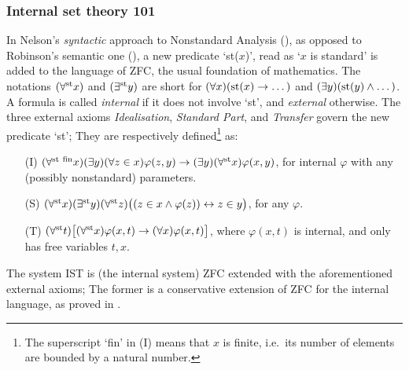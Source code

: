 \documentclass[reqno]{amsart}
\def\st{\textup{st}}
\def\di{\rightarrow}
\def\asa{\leftrightarrow}
\numberwithin{equation}{section}
\numberwithin{thm}{section}
\begin{document}
\subsubsection{Internal set theory 101}\label{IIST}
In Nelson's \emph{syntactic} approach to Nonstandard Analysis (\cite{wownelly}), as opposed to Robinson's semantic one (\cite{robinson1}), a new predicate `st($x$)', read as `$x$ is standard' is added to the language of \textsf{ZFC}, the usual foundation of mathematics.  
The notations $(\forall^{\st}x)$ and $(\exists^{\st}y)$ are short for $(\forall x)(\st(x)\di \dots)$ and $(\exists y)(\st(y)\wedge \dots)$.  A formula is called \emph{internal} if it does not involve `st', and \emph{external} otherwise.   
The three external axioms \emph{Idealisation}, \emph{Standard Part}, and \emph{Transfer} govern the new predicate `st';  They are respectively defined\footnote{The superscript `fin' in \textsf{(I)} means that $x$ is finite, i.e.\ its number of elements are bounded by a natural number.} as:  
\begin{enumerate}
\item[\textsf{(I)}] $(\forall^{\st~\textup{fin}}x)(\exists y)(\forall z\in x)\varphi(z,y)\di (\exists y)(\forall^{\st}x)\varphi(x,y)$, for internal $\varphi$ with any (possibly nonstandard) parameters.  
\item[\textsf{(S)}] $(\forall^{\st} x)(\exists^{\st}y)(\forall^{\st}z)\big((z\in x\wedge \varphi(z))\asa z\in y\big)$, for any $\varphi$.
\item[\textsf{(T)}] $(\forall^{\st}t)\big[(\forall^{\st}x)\varphi(x, t)\di (\forall x)\varphi(x, t)\big]$, where $\varphi(x,t)$ is internal, and only has free variables $t, x$.  %
\end{enumerate}
The system \textsf{IST} is (the internal system) \textsf{ZFC} extended with the aforementioned external axioms;  
The former is a conservative extension of \textsf{ZFC} for the internal language, as proved in \cite{wownelly}.    %

\medskip
\end{document}
